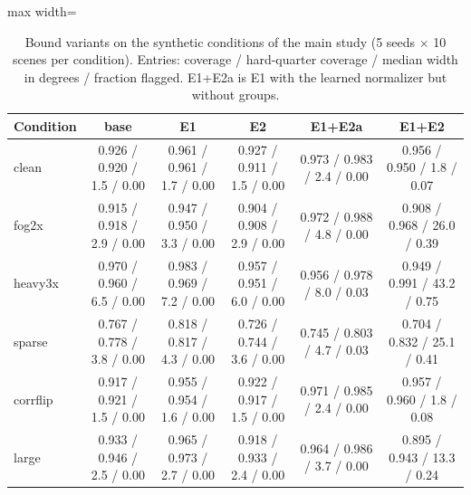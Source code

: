 \begin{table}[!htbp]\centering\footnotesize
\caption{Bound variants on the synthetic conditions of the main study (5 seeds $\times$ 10 scenes per condition). Entries: coverage / hard-quarter coverage / median width in degrees / fraction flagged. E1+E2a is E1 with the learned normalizer but without groups.}\label{tab:s6synth}
\begin{adjustbox}{max width=\textwidth}\begin{tabular}{lccccc}\toprule
Condition & base & E1 & E2 & E1+E2a & E1+E2 \\\midrule
clean & 0.926 / 0.920 / 1.5 / 0.00 & 0.961 / 0.961 / 1.7 / 0.00 & 0.927 / 0.911 / 1.5 / 0.00 & 0.973 / 0.983 / 2.4 / 0.00 & 0.956 / 0.950 / 1.8 / 0.07 \\
fog2x & 0.915 / 0.918 / 2.9 / 0.00 & 0.947 / 0.950 / 3.3 / 0.00 & 0.904 / 0.908 / 2.9 / 0.00 & 0.972 / 0.988 / 4.8 / 0.00 & 0.908 / 0.968 / 26.0 / 0.39 \\
heavy3x & 0.970 / 0.960 / 6.5 / 0.00 & 0.983 / 0.969 / 7.2 / 0.00 & 0.957 / 0.951 / 6.0 / 0.00 & 0.956 / 0.978 / 8.0 / 0.03 & 0.949 / 0.991 / 43.2 / 0.75 \\
sparse & 0.767 / 0.778 / 3.8 / 0.00 & 0.818 / 0.817 / 4.3 / 0.00 & 0.726 / 0.744 / 3.6 / 0.00 & 0.745 / 0.803 / 4.7 / 0.03 & 0.704 / 0.832 / 25.1 / 0.41 \\
corrflip & 0.917 / 0.921 / 1.5 / 0.00 & 0.955 / 0.954 / 1.6 / 0.00 & 0.922 / 0.917 / 1.5 / 0.00 & 0.971 / 0.985 / 2.4 / 0.00 & 0.957 / 0.960 / 1.8 / 0.08 \\
large & 0.933 / 0.946 / 2.5 / 0.00 & 0.965 / 0.973 / 2.7 / 0.00 & 0.918 / 0.933 / 2.4 / 0.00 & 0.964 / 0.986 / 3.7 / 0.00 & 0.895 / 0.943 / 13.3 / 0.24 \\
\bottomrule\end{tabular}\end{adjustbox}\end{table}
